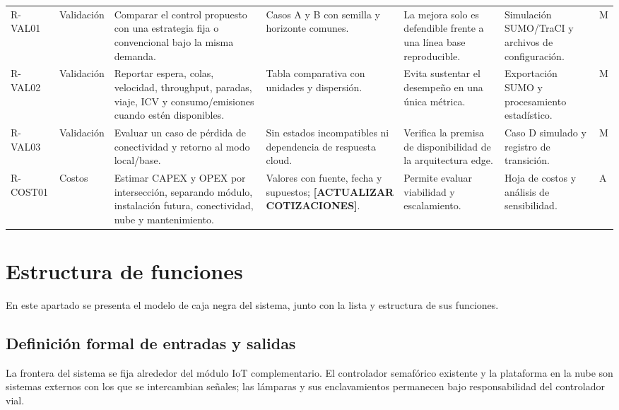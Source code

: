 \documentclass[12pt,a4paper,oneside]{report}
\begin{document}
\begin{landscape}
\begin{longtable}{@{}p{1.15cm}p{1.65cm}p{5.25cm}p{3.15cm}p{4.35cm}p{3.65cm}p{1.25cm}@{}}
R-VAL01 & Validación & Comparar el control propuesto con una estrategia fija o convencional bajo la misma demanda. & Casos A y B con semilla y horizonte comunes. & La mejora solo es defendible frente a una línea base reproducible. & Simulación SUMO/TraCI y archivos de configuración. & M\\
R-VAL02 & Validación & Reportar espera, colas, velocidad, throughput, paradas, viaje, ICV y consumo/emisiones cuando estén disponibles. & Tabla comparativa con unidades y dispersión. & Evita sustentar el desempeño en una única métrica. & Exportación SUMO y procesamiento estadístico. & M\\
R-VAL03 & Validación & Evaluar un caso de pérdida de conectividad y retorno al modo local/base. & Sin estados incompatibles ni dependencia de respuesta cloud. & Verifica la premisa de disponibilidad de la arquitectura edge. & Caso D simulado y registro de transición. & M\\
R-COST01 & Costos & Estimar CAPEX y OPEX por intersección, separando módulo, instalación futura, conectividad, nube y mantenimiento. & Valores con fuente, fecha y supuestos; \textbf{[ACTUALIZAR COTIZACIONES]}. & Permite evaluar viabilidad y escalamiento. & Hoja de costos y análisis de sensibilidad. & A\\
\end{longtable}
\end{landscape}

\section{Estructura de funciones}\label{estructura-de-funciones}

En este apartado se presenta el modelo de caja negra del sistema, junto con la lista y estructura de sus funciones.

\subsection{Definición formal de entradas y salidas}\label{entradas-salidas-formales}

La frontera del sistema se fija alrededor del módulo IoT complementario. El controlador semafórico existente y la plataforma en la nube son sistemas externos con los que se intercambian señales; las lámparas y sus enclavamientos permanecen bajo responsabilidad del controlador vial.
\end{document}
